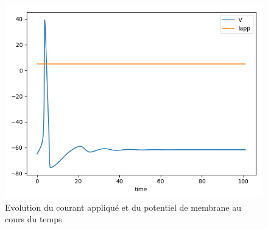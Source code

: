 \documentclass[12pt]{scrartcl}
\begin{document}
\begin{figure}[!h]
\centering
\includegraphics[scale=0.5]{imgs/hh11.png}
\caption{Evolution du courant appliqué et du potentiel de membrane au cours du temps}
\label{hh11}
\end{figure}
\end{document}
